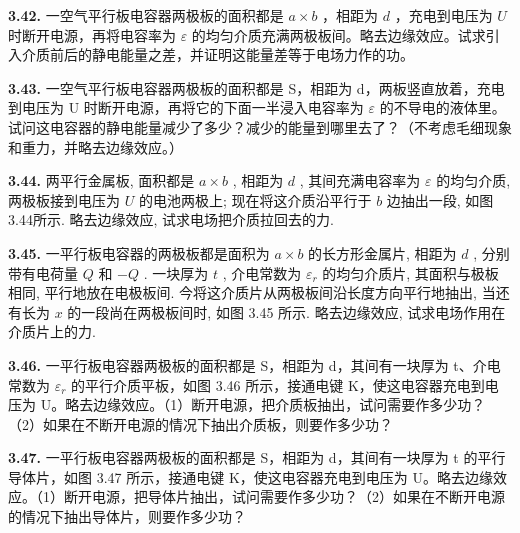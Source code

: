 \vfill
\newpage

\textbf{3.42.} 一空气平行板电容器两极板的面积都是 $a \times b$ ，相距为 $d$ ，充电到电压为 $U$ 时断开电源，再将电容率为 $\varepsilon$ 的均匀介质充满两极板间。略去边缘效应。试求引入介质前后的静电能量之差，并证明这能量差等于电场力作的功。

\vfill
\newpage

\textbf{3.43.} 一空气平行板电容器两极板的面积都是 S，相距为 d，两板竖直放着，充电到电压为 U 时断开电源，再将它的下面一半浸入电容率为 $\varepsilon$ 的不导电的液体里。试问这电容器的静电能量减少了多少？减少的能量到哪里去了？（不考虑毛细现象和重力，并略去边缘效应。）

\vfill
\newpage

\textbf{3.44.} 两平行金属板, 面积都是 $a \times b$ , 相距为 $d$ , 其间充满电容率为 $\varepsilon$ 的均匀介质, 两极板接到电压为 $U$ 的电池两极上; 现在将这介质沿平行于 $b$ 边抽出一段, 如图3.44所示. 略去边缘效应, 试求电场把介质拉回去的力.

\vfill
\newpage

\textbf{3.45.} 一平行板电容器的两极板都是面积为 $a \times b$ 的长方形金属片, 相距为 $d$ , 分别带有电荷量 $Q$ 和 $-Q$ . 一块厚为 $t$ , 介电常数为 $\varepsilon_{r}$ 的均匀介质片, 其面积与极板相同, 平行地放在电极板间. 今将这介质片从两极板间沿长度方向平行地抽出, 当还有长为 $x$ 的一段尚在两极板间时, 如图 3.45 所示. 略去边缘效应, 试求电场作用在介质片上的力.

\begin{center}
\end{center}

\vfill
\newpage

\textbf{3.46.} 一平行板电容器两极板的面积都是 S，相距为 d，其间有一块厚为 t、介电常数为 $\varepsilon_{r}$ 的平行介质平板，如图 3.46 所示，接通电键 K，使这电容器充电到电压为 U。略去边缘效应。（1）断开电源，把介质板抽出，试问需要作多少功？（2）如果在不断开电源的情况下抽出介质板，则要作多少功？

\vfill
\newpage

\textbf{3.47.} 一平行板电容器两极板的面积都是 S，相距为 d，其间有一块厚为 t 的平行导体片，如图 3.47 所示，接通电键 K，使这电容器充电到电压为 U。略去边缘效应。（1）断开电源，把导体片抽出，试问需要作多少功？（2）如果在不断开电源的情况下抽出导体片，则要作多少功？

\begin{center}
\end{center}

\vfill
\newpage
